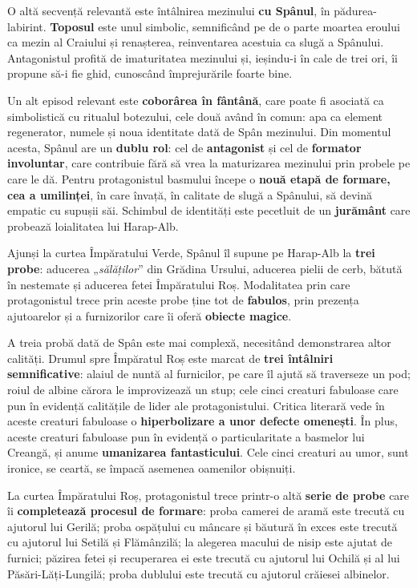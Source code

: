\documentclass{article}
\newcommand{\qu}[1]{„\emph{#1}”}
\begin{document}
O altă secvență relevantă este întâlnirea mezinului \textbf{cu Spânul}, în pădurea-labirint. \textbf{Toposul} este unul simbolic, semnificând pe de o parte moartea eroului ca mezin al Craiului și renașterea, reinventarea acestuia ca slugă a Spânului. Antagonistul profită de imaturitatea mezinului și, ieșindu-i în cale de trei ori, îi propune să-i fie ghid, cunoscând împrejurările foarte bine.

Un alt episod relevant este \textbf{coborârea în fântână}, care poate fi asociată ca simbolistică cu ritualul botezului, cele două având în comun: apa ca element regenerator, numele și noua identitate dată de Spân mezinului. Din momentul acesta, Spânul are un \textbf{dublu rol}: cel de \textbf{antagonist} și cel de \textbf{formator involuntar}, care contribuie fără să vrea la maturizarea mezinului prin probele pe care le dă. Pentru protagonistul basmului începe o \textbf{nouă etapă de formare, cea a umilinței}, în care învață, în calitate de slugă a Spânului, să devină empatic cu supușii săi. Schimbul de identități este pecetluit de un \textbf{jurământ} care probează loialitatea lui Harap-Alb.

Ajunși la curtea Împăratului Verde, Spânul îl supune pe Harap-Alb la \textbf{trei probe}: aducerea \qu{sălăților} din Grădina Ursului, aducerea pielii de cerb, bătută în nestemate și aducerea fetei Împăratului Roș. Modalitatea prin care protagonistul trece prin aceste probe ține tot de \textbf{fabulos}, prin prezența ajutoarelor și a furnizorilor care îi oferă \textbf{obiecte magice}.

A treia probă dată de Spân este mai complexă, necesitând demonstrarea altor calități. Drumul spre Împăratul Roș este marcat de \textbf{trei întâlniri semnificative}: alaiul de nuntă al furnicilor, pe care îl ajută să traverseze un pod; roiul de albine cărora le improvizează un stup; cele cinci creaturi fabuloase care pun în evidență calitățile de lider ale protagonistului. Critica literară vede în aceste creaturi fabuloase o \textbf{hiperbolizare a unor defecte omenești}. În plus, aceste creaturi fabuloase pun în evidență o particularitate a basmelor lui Creangă, și anume \textbf{umanizarea fantasticului}. Cele cinci creaturi au umor, sunt ironice, se ceartă, se împacă asemenea oamenilor obișnuiți.

La curtea Împăratului Roș, protagonistul trece printr-o altă \textbf{serie de probe} care îi \textbf{completează procesul de formare}: proba camerei de aramă este trecută cu ajutorul lui Gerilă; proba ospățului cu mâncare și băutură în exces este trecută cu ajutorul lui Setilă și Flămânzilă; la alegerea macului de nisip este ajutat de furnici; păzirea fetei și recuperarea ei este trecută cu ajutorul lui Ochilă și al lui Păsări-Lăți-Lungilă; proba dublului este trecută cu ajutorul crăiesei albinelor.
\end{document}
